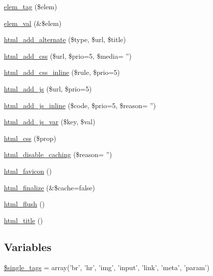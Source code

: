 \begin{DoxyCompactItemize}
\hyperlink{html_8inc_8php_a158c5e6dccf734bc8c035e6bcd0a446f}{elem\_\-tag} (\$elem)
\item 
\hyperlink{html_8inc_8php_ae28d850c3c906c6884462ca89c06f59b}{elem\_\-val} (\&\$elem)
\item 
\hyperlink{html_8inc_8php_ae013e8f0bdd681184ee1873a1964c454}{html\_\-add\_\-alternate} (\$type, \$url, \$title)
\item 
\hyperlink{html_8inc_8php_a962ef1b29e909a38b9a7b79086d54ab2}{html\_\-add\_\-css} (\$url, \$prio=5, \$media= '')
\item 
\hyperlink{html_8inc_8php_aae42f14c51b89215ad79b303ecb6e9e9}{html\_\-add\_\-css\_\-inline} (\$rule, \$prio=5)
\item 
\hyperlink{html_8inc_8php_a450214704e1bbc2e8849abb54db38a03}{html\_\-add\_\-js} (\$url, \$prio=5)
\item 
\hyperlink{html_8inc_8php_a9b9c28bfb08c81ccc10a3064b6775dc0}{html\_\-add\_\-js\_\-inline} (\$code, \$prio=5, \$reason= '')
\item 
\hyperlink{html_8inc_8php_a84769b7fe7b5454ff46534d0577eb54c}{html\_\-add\_\-js\_\-var} (\$key, \$val)
\item 
\hyperlink{html_8inc_8php_ad52276fa2a03df7342ba4b8e6a334ce0}{html\_\-css} (\$prop)
\item 
\hyperlink{html_8inc_8php_ab0dafe79ee61164014b0a4d8b4112dbb}{html\_\-disable\_\-caching} (\$reason= '')
\item 
\hyperlink{html_8inc_8php_a5738adf9b56d1ff2b8d02977ed7929ce}{html\_\-favicon} ()
\item 
\hyperlink{html_8inc_8php_a405dc7e3718d4196c05087057ebf69bf}{html\_\-finalize} (\&\$cache=false)
\item 
\hyperlink{html_8inc_8php_af8cd696bd10c945b09dae962d549b75b}{html\_\-flush} ()
\item 
\hyperlink{html_8inc_8php_a3f572f51a815fe19c590fea7d6d3a1a6}{html\_\-title} ()
\end{DoxyCompactItemize}
\subsection*{Variables}
\begin{DoxyCompactItemize}
\item 
\hyperlink{html_8inc_8php_a0a733c7a281726a879f13e7325881887}{\$single\_\-tags} = array('br', 'hr', 'img', 'input', 'link', 'meta', 'param')
\end{DoxyCompactItemize}


